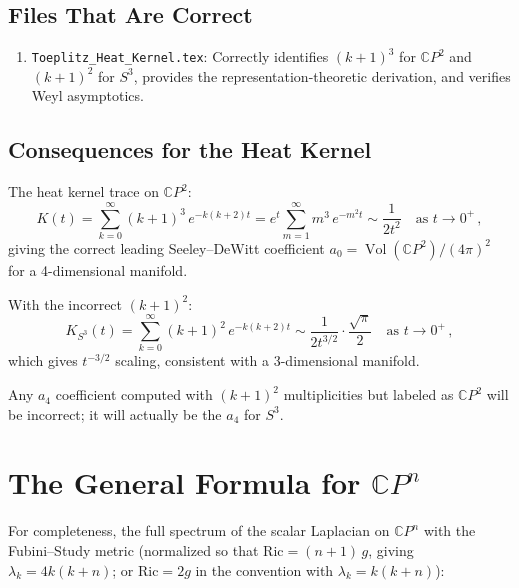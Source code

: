 \documentclass[11pt]{article}
\theoremstyle{remark}
\begin{document}
\subsection{Files That Are Correct}

\begin{enumerate}
\item \texttt{Toeplitz\_Heat\_Kernel.tex}: Correctly identifies $(k+1)^3$
  for $\mathbb{C}P^2$ and $(k+1)^2$ for $S^3$, provides the
  representation-theoretic derivation, and verifies Weyl asymptotics.
\end{enumerate}

\subsection{Consequences for the Heat Kernel}

The heat kernel trace on $\mathbb{C}P^2$:
\begin{equation}
K(t) = \sum_{k=0}^{\infty} (k+1)^3\,e^{-k(k+2)t}
     = e^t \sum_{m=1}^{\infty} m^3\,e^{-m^2 t}
     \sim \frac{1}{2t^2} \quad\text{as } t\to 0^+\,,
\end{equation}
giving the correct leading Seeley--DeWitt coefficient
$a_0 = \operatorname{Vol}(\mathbb{C}P^2)/(4\pi)^2$ for a 4-dimensional
manifold.

With the incorrect $(k+1)^2$:
\begin{equation}
K_{S^3}(t) = \sum_{k=0}^{\infty} (k+1)^2\,e^{-k(k+2)t}
\sim \frac{1}{2t^{3/2}}\cdot\frac{\sqrt{\pi}}{2}
\quad\text{as }t\to 0^+\,,
\end{equation}
which gives $t^{-3/2}$ scaling, consistent with a 3-dimensional manifold.

Any $a_4$ coefficient computed with $(k+1)^2$ multiplicities but labeled
as $\mathbb{C}P^2$ will be incorrect; it will actually be the $a_4$ for $S^3$.

\section{The General Formula for $\mathbb{C}P^n$}

For completeness, the full spectrum of the scalar Laplacian on
$\mathbb{C}P^n$ with the Fubini--Study metric (normalized so that
$\mathrm{Ric} = (n{+}1)\,g$, giving $\lambda_k = 4k(k+n)$; or
$\mathrm{Ric} = 2g$ in the convention with $\lambda_k = k(k+n)$):
\end{document}
